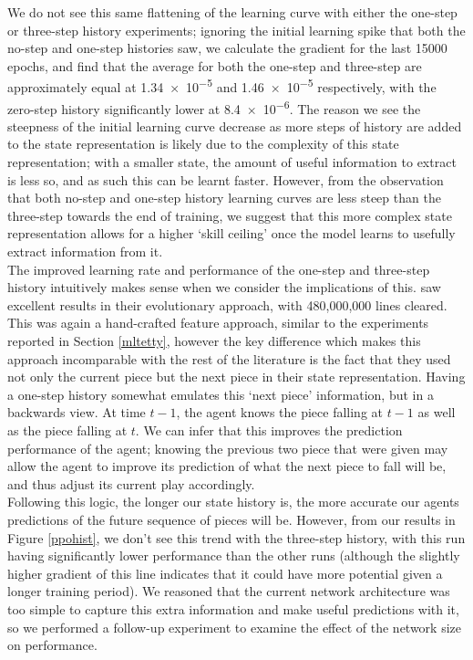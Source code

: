 \documentclass[12pt]{article}
\begin{document}
We do not see this same flattening of the learning curve with either the one-step or three-step history experiments; ignoring the initial learning spike that both the no-step and one-step histories saw, we calculate the gradient for the last 15000 epochs, and find that the average for both the one-step and three-step are approximately equal at \num{1.34e-5} and \num{1.46e-5} respectively, with the zero-step history significantly lower at \num{8.4e-6}. The reason we see the steepness of the initial learning curve decrease as more steps of history are added to the state representation is likely due to the complexity of this state representation; with a smaller state, the amount of useful information to extract is less so, and as such this can be learnt faster. However, from the observation that both no-step and one-step history learning curves are less steep than the three-step towards the end of training, we suggest that this more complex state representation allows for a higher `skill ceiling' once the model learns to usefully extract information from it.  \\\newline
The improved learning rate and performance of the one-step and three-step history intuitively makes sense when we consider the implications of this. \textcite{bohm2005evolutionary} saw excellent results in their evolutionary approach, with 480,000,000 lines cleared. This was again a hand-crafted feature approach, similar to the experiments reported in Section \ref{mltetty}, however the key difference which makes this approach incomparable with the rest of the literature is the fact that they used not only the current piece but the next piece in their state representation. Having a one-step history somewhat emulates this `next piece' information, but in a backwards view. At time $t-1$, the agent knows the piece falling at $t-1$ as well as the piece falling at $t$. We can infer that this improves the prediction performance of the agent; knowing the previous two piece that were given may allow the agent to improve its prediction of what the next piece to fall will be, and thus adjust its current play accordingly.\\\newline
Following this logic, the longer our state history is, the more accurate our agents predictions of the future sequence of pieces will be. However, from our results in Figure \ref{ppohist}, we don't see this trend with the three-step history, with this run having significantly lower performance than the other runs (although the slightly higher gradient of this line indicates that it could have more potential given a longer training period). We reasoned that the current network architecture was too simple to capture this extra information and make useful predictions with it, so we performed a follow-up experiment to examine the effect of the network size on performance.
\end{document}

